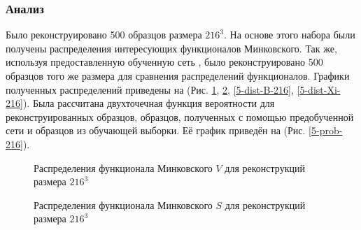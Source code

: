 		\subsubsection{Анализ}
			Было реконструировано 500 образцов размера $216^3$. На основе этого набора были получены распределения интересующих функционалов Минковского. Так же, используя предоставленную обученную сеть \cite{Mosser}, было реконструировано 500 образцов того же размера для сравнения распределений функционалов. Графики полученных распределений приведены на (Рис. \ref{5-dist-V-216}, \ref{5-dist-S-216}, \ref{5-dist-B-216}, \ref{5-dist-Xi-216}). Была рассчитана двухточечная функция вероятности для реконструированных образцов, образцов, полученных с помощью предобученной сети \cite{Mosser} и образцов из обучающей выборки. Её график приведён на (Рис. \ref{5-prob-216}).
		
			\begin{figure}[h]
				\begin{minipage}[h]{0.49\linewidth}
				\end{minipage}
				\hfill
				\begin{minipage}[h]{0.49\linewidth}
				\end{minipage}
				\caption{Распределения функционала Минковского $V$ для реконструкций размера $216^3$}
				\label{5-dist-V-216}
			\end{figure}
			
			\begin{figure}[h]
				\begin{minipage}[h]{0.49\linewidth}
				\end{minipage}
				\hfill
				\begin{minipage}[h]{0.49\linewidth}
				\end{minipage}
				\caption{Распределения функционала Минковского $S$ для реконструкций размера $216^3$}
				\label{5-dist-S-216}
			\end{figure}
			

